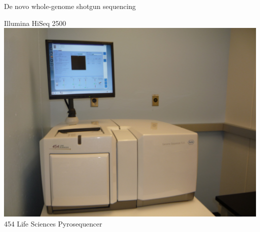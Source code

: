 \documentclass[xcolor=dvipsnames]{beamer}
\begin{document}
\begin{frame}{De novo whole-genome shotgun sequencing}
\begin{minipage}{0.32\textwidth}
\begin{center}
                Illumina HiSeq 2500 \\
            \vspace{0.2cm}
            \includegraphics[width=1.0\textwidth]{454_Sequencer.jpg} \\
                454 Life Sciences Pyrosequencer \\
        \end{center}
    \end{minipage}
\end{frame}
\end{document}
